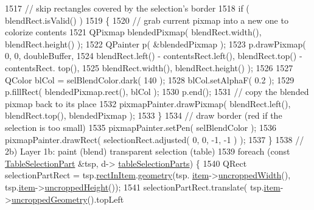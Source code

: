 \begin{DoxyCode}
1517                     \textcolor{comment}{// skip rectangles covered by the selection's border}
1518                     \textcolor{keywordflow}{if} ( blendRect.isValid() )
1519                     \{
1520                         \textcolor{comment}{// grab current pixmap into a new one to colorize contents}
1521                         QPixmap blendedPixmap( blendRect.width(), blendRect.height() );
1522                         QPainter p( &blendedPixmap );
1523                         p.drawPixmap( 0, 0, doubleBuffer,
1524                                     blendRect.left() - contentsRect.left(), blendRect.top() - contentsRect.
      top(),
1525                                     blendRect.width(), blendRect.height() );
1526 
1527                         QColor blCol = selBlendColor.dark( 140 );
1528                         blCol.setAlphaF( 0.2 );
1529                         p.fillRect( blendedPixmap.rect(), blCol );
1530                         p.end();
1531                         \textcolor{comment}{// copy the blended pixmap back to its place}
1532                         pixmapPainter.drawPixmap( blendRect.left(), blendRect.top(), blendedPixmap );
1533                     \}
1534                     \textcolor{comment}{// draw border (red if the selection is too small)}
1535                     pixmapPainter.setPen( selBlendColor );
1536                     pixmapPainter.drawRect( selectionRect.adjusted( 0, 0, -1, -1 ) );
1537                 \}
1538                 \textcolor{comment}{// 2b) Layer 1b: paint (blend) transparent selection (table)}
1539                 \textcolor{keywordflow}{foreach} (\textcolor{keyword}{const} \hyperlink{structTableSelectionPart}{TableSelectionPart} &tsp, d->
      \hyperlink{classPageViewPrivate_aec476c0b74867740803d4ba34393b154}{tableSelectionParts}) \{
1540                     QRect selectionPartRect = tsp.\hyperlink{structTableSelectionPart_ade01925b1444763cb413ad51ae7729a7}{rectInItem}.\hyperlink{classOkular_1_1NormalizedRect_a006897c5fcff2c3a97b4141f1a967513}{geometry}(tsp.
      \hyperlink{structTableSelectionPart_a400edc4e1ec30e28ff8159a741776e4b}{item}->\hyperlink{classPageViewItem_a240924407ae22bb0489363a6a2d481b9}{uncroppedWidth}(), tsp.\hyperlink{structTableSelectionPart_a400edc4e1ec30e28ff8159a741776e4b}{item}->\hyperlink{classPageViewItem_af1380fce5dc13a72458ef834c720b128}{uncroppedHeight}());
1541                     selectionPartRect.translate( tsp.\hyperlink{structTableSelectionPart_a400edc4e1ec30e28ff8159a741776e4b}{item}->\hyperlink{classPageViewItem_a5d2e73a003f65b4e95c0c21b1698f835}{uncroppedGeometry}().topLeft

\end{DoxyCode}
